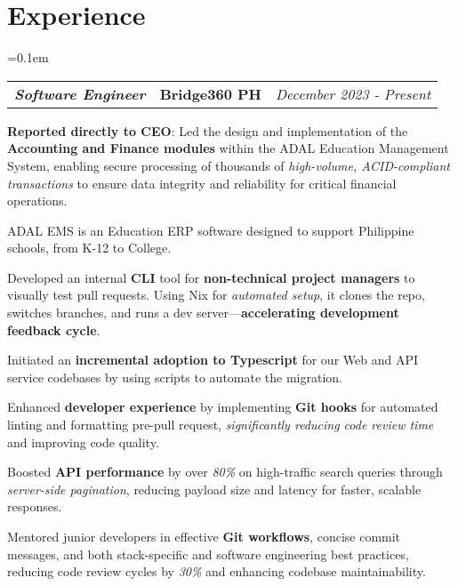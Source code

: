 \documentclass[11pt,letterpaper]{article}
\makeatletter
\newcommand{\headerrowthree}[3]{%
  \begin{tabular*}{\linewidth}{l@{\extracolsep{\fill}}c@{\extracolsep{\fill}}r}
    #1 & %
    #2 & %
    #3 \\ %
  \end{tabular*}
}
\makeatother
\begin{document}
\section*{\Large Experience}

\renewcommand\labelitemi{}
\renewcommand\labelitemii{$\bullet$}
\begin{itemize}[leftmargin=1em]
	\parskip=0.1em
	\item
	      \headerrowthree
          {\textbf{\textit{Software Engineer}}}
	      {\textbf{Bridge360 PH}}
	      {\textit{December 2023 - Present}}
            \item Developed an internal \textbf{CLI} tool for \textbf{non-technical project managers} to visually test pull requests. Using Nix for \textit{automated setup}, it clones the repo, switches branches, and runs a dev server—\textbf{accelerating development feedback cycle}.
            \item Initiated an \textbf{incremental adoption to Typescript} for our Web and API service codebases by using scripts to automate the migration.
            \item Enhanced \textbf{developer experience} by implementing \textbf{Git hooks} for automated linting and formatting pre-pull request, \textit{significantly reducing code review time} and improving code quality.
            \item Boosted \textbf{API performance} by over \textit{80\%} on high-traffic search queries through \textit{server-side pagination}, reducing payload size and latency for faster, scalable responses.
            \item Mentored junior developers in effective \textbf{Git workflows}, concise commit messages, and both stack-specific and software engineering best practices, reducing code review cycles by \textit{30\%} and enhancing codebase maintainability.

\end{itemize*}
\end{itemize}
\end{document}
